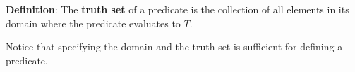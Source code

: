 
{\bf Definition}: The {\bf truth  set} of a  predicate is the collection of all elements in its
domain where the predicate evaluates to $T$.

Notice that specifying the domain and the truth set is sufficient for defining
a predicate.